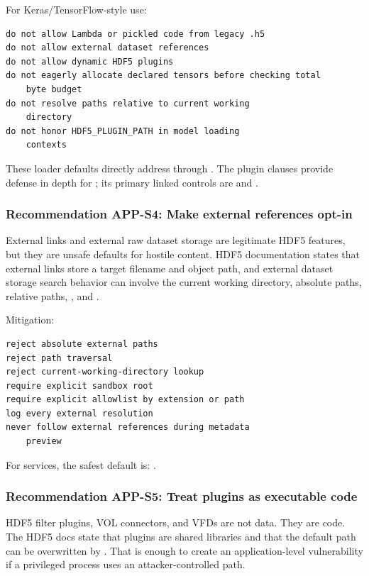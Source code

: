 \documentclass[../main.tex]{subfiles}
\begin{document}
For Keras/TensorFlow-style use:
\begin{verbatim}
do not allow Lambda or pickled code from legacy .h5
do not allow external dataset references
do not allow dynamic HDF5 plugins
do not eagerly allocate declared tensors before checking total
    byte budget
do not resolve paths relative to current working
    directory
do not honor HDF5_PLUGIN_PATH in model loading
    contexts
\end{verbatim}   
These loader defaults directly address  through
. The plugin clauses provide defense in depth for
; its primary linked controls are  and
.

\subsubsection*{Recommendation APP-S4: Make external references opt-in}

External links and external raw dataset storage are legitimate HDF5 features,
but they are unsafe defaults for hostile content.
HDF5 documentation states that external links store a target
filename and object path, and external dataset storage search
behavior can involve the current working directory, absolute
paths, relative paths, , and .

Mitigation:
\begin{verbatim}
reject absolute external paths
reject path traversal
reject current-working-directory lookup
require explicit sandbox root
require explicit allowlist by extension or path
log every external resolution
never follow external references during metadata
    preview
\end{verbatim}

For services, the safest default is: .

\subsubsection*{Recommendation APP-S5: Treat plugins as executable code}

HDF5 filter plugins, VOL connectors, and VFDs are not data.
They are code. The HDF5 docs state that plugins are shared
libraries and that the default path can be overwritten by
. That is enough to create an
application-level vulnerability if a privileged process uses an
attacker-controlled path.
\end{document}
